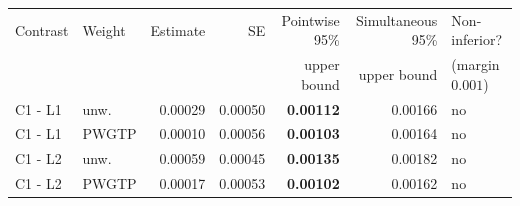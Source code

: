 \begin{tabular}{llrrrrl}
\toprule
Contrast & Weight & Estimate & SE & Pointwise 95\% & Simultaneous 95\% & Non-inferior? \\
         &        &          &    & upper bound     & upper bound      & (margin $0.001$) \\
\midrule
C1 - L1 & unw. & 0.00029 & 0.00050 & \textbf{0.00112} & 0.00166 & no \\
C1 - L1 & PWGTP & 0.00010 & 0.00056 & \textbf{0.00103} & 0.00164 & no \\
C1 - L2 & unw. & 0.00059 & 0.00045 & \textbf{0.00135} & 0.00182 & no \\
C1 - L2 & PWGTP & 0.00017 & 0.00053 & \textbf{0.00102} & 0.00162 & no \\
\bottomrule
\end{tabular}
